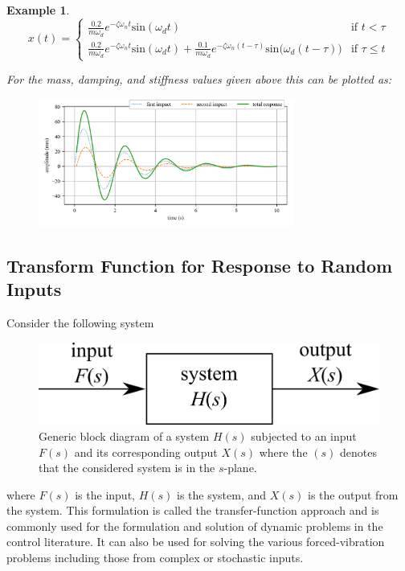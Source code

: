 \documentclass[12pt,letter]{article}
\newtheorem{ex}{Example}
\numberwithin{ex}{section} %
\newenvironment{example}{\begin{mdframed}[middlelinewidth=0.5mm]\begin{ex}\normalfont}{\end{ex}\end{mdframed}}
\numberwithin{re}{section} %
\begin{document}
\begin{example}
\[
  x(t) = 
  \begin{cases}
\frac{0.2}{m \omega_d} e^{-\zeta \omega_n t} \text{sin}(\omega_dt) & \text{if } t < \tau \\
\frac{0.2}{m \omega_d} e^{-\zeta \omega_n t} \text{sin}(\omega_dt)  + \frac{0.1}{m \omega_d} e^{-\zeta \omega_n (t-\tau)} \text{sin}\big(\omega_d(t-\tau)\big) & \text{if } \tau \leq t 
  \end{cases}
\]


For the mass, damping, and stiffness values given above this can be plotted as:
\begin{figure}[H]
	\centering
	\includegraphics[width=0.75\textwidth]{../Figures/response_double_impact.png}
\end{figure}

\end{example}


\subsection{Transform Function for Response to Random Inputs}

			Consider the following system
			\begin{figure}[H]
				\centering
				\includegraphics[]{../Figures/transfer_function_system.png}
				\caption{Generic block diagram of a system $H(s)$ subjected to an input $F(s)$ and its corresponding output $X(s)$ where the $(s)$ denotes that the considered system is in the $s$-plane.}
				\label{fig:transfer_function_system}
			\end{figure}
			\noindent where $F(s)$ is the input, $H(s)$ is the system, and $X(s)$ is the output from the system. This formulation is called the transfer-function approach and is commonly used for the formulation and solution of dynamic problems in the control literature. It can also be used for solving the various forced-vibration problems including those from complex or stochastic inputs. 
	
\end{document}
